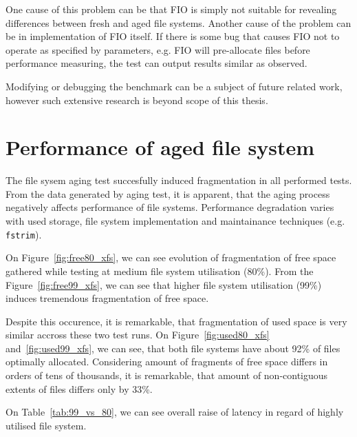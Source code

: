 \documentclass[
  color, %
  table, %
  lof,   %
  lot,   %
]{fithesis3}
\begin{document}
One cause of this problem can be that FIO is simply not suitable for revealing differences between fresh and aged file systems. Another cause of the problem can be in implementation of FIO itself. If there is some bug that causes FIO not to operate as specified by parameters, e.g. FIO will pre-allocate files before performance measuring, the test can output results similar as observed.

Modifying or debugging the benchmark can be a subject of future related work, however such extensive research is beyond scope of this thesis.



\section{Performance of aged file system}
The file sysem aging test succesfully induced fragmentation in all performed tests. From the data generated by aging test, it is apparent, that the aging process negatively affects performance of file systems. Performance degradation varies with used storage, file system implementation and maintainance techniques (e.g. \texttt{fstrim}).

On Figure~\ref{fig:free80_xfs}, we can see evolution of fragmentation of free space gathered while testing at medium file system utilisation (80\%). From the Figure~\ref{fig:free99_xfs}, we can see that higher file system utilisation (99\%) induces tremendous fragmentation of free space.

Despite this occurence, it is remarkable, that fragmentation of used space is very similar accross these two test runs. On Figure~\ref{fig:used80_xfs} and~\ref{fig:used99_xfs}, we can see, that both file systems have about 92\% of files optimally allocated. Considering amount of fragments of free space differs in orders of tens of thousands, it is remarkable, that amount of non-contiguous extents of files differs only by 33\%.

On Table~\ref{tab:99_vs_80}, we can see overall raise of latency in regard of highly utilised file system.
\end{document}
